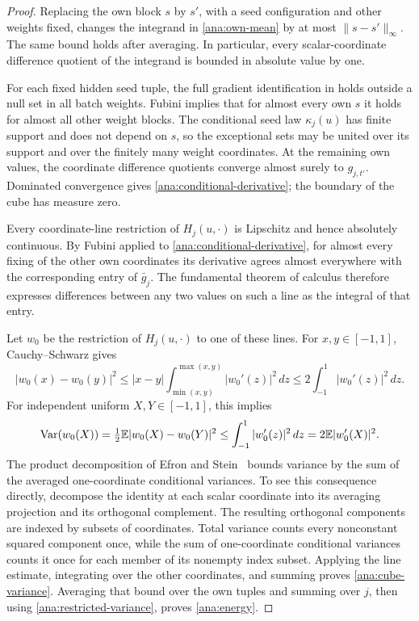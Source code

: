 \begin{proof}
Replacing the own block \(s\) by \(s'\), with a seed configuration
and other weights fixed, changes the integrand in
\eqref{ana:own-mean} by at most \(\|s-s'\|_\infty\). The same
bound holds after averaging. In particular, every scalar-coordinate
difference quotient of the integrand is bounded in absolute value
by one.

For each fixed hidden seed tuple, the full gradient identification
in  holds outside a null set in all batch weights.
Fubini implies that for almost every own \(s\) it holds for almost
all other weight blocks. The conditional seed law \(\kappa_j(u)\) has
finite support and does not depend on \(s\), so the exceptional sets
may be united over its support and over the finitely many weight
coordinates. At the remaining own values, the coordinate difference
quotients converge almost surely to \(g_{j,t'}\). Dominated
convergence gives \eqref{ana:conditional-derivative}; the boundary
of the cube has measure zero.

Every coordinate-line restriction of \(H_j(u,\cdot)\) is
Lipschitz and hence absolutely continuous. By Fubini applied to
\eqref{ana:conditional-derivative}, for almost every fixing of the
other own coordinates its derivative agrees almost everywhere with
the corresponding entry of \(\bar g_j\). The fundamental theorem
of calculus therefore expresses differences between any two values
on such a line as the integral of that entry.

Let \(w_0\) be the restriction of \(H_j(u,\cdot)\) to one of these
lines. For \(x,y\in[-1,1]\), Cauchy--Schwarz gives
\[
 |w_0(x)-w_0(y)|^2
    \leq |x-y|\int_{\min(x,y)}^{\max(x,y)}|w_0'(z)|^2\,dz
    \leq2\int_{-1}^1|w_0'(z)|^2\,dz.
\]
For independent uniform \(X,Y\in[-1,1]\), this implies
\[
 \operatorname{Var}(w_0(X))=\tfrac12\mathbb E|w_0(X)-w_0(Y)|^2
      \leq\int_{-1}^1|w_0'(z)|^2\,dz
      =2\mathbb E|w_0'(X)|^2.
\]
The product decomposition of Efron and
Stein~\cite[Section~2]{EfronStein1981} bounds variance by the sum
of the averaged one-coordinate conditional variances. To see this
consequence directly,
decompose the identity at each scalar coordinate into its averaging
projection and its orthogonal complement. The resulting orthogonal
components are indexed by subsets of coordinates. Total variance
counts every nonconstant squared component once, while the sum of
one-coordinate conditional variances counts it once for each member
of its nonempty index subset. Applying the line estimate,
integrating over the other coordinates, and summing proves
\eqref{ana:cube-variance}. Averaging that bound over the own tuples
and summing over \(j\), then using
\eqref{ana:restricted-variance}, proves \eqref{ana:energy}.
\end{proof}

